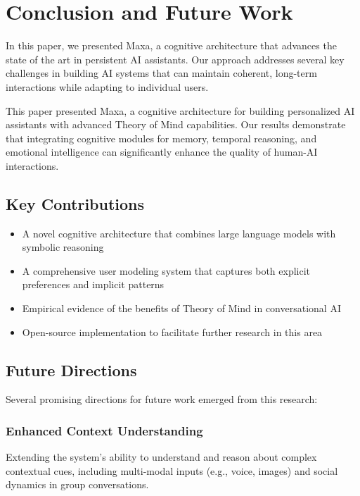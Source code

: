 \section{Conclusion and Future Work}
\label{sec:conclusion}

In this paper, we presented Maxa, a cognitive architecture that advances the state of the art in persistent AI assistants. Our approach addresses several key challenges in building AI systems that can maintain coherent, long-term interactions while adapting to individual users.

This paper presented Maxa, a cognitive architecture for building personalized AI assistants with advanced Theory of Mind capabilities. Our results demonstrate that integrating cognitive modules for memory, temporal reasoning, and emotional intelligence can significantly enhance the quality of human-AI interactions.

\subsection{Key Contributions}

\begin{itemize}
    \item A novel cognitive architecture that combines large language models with symbolic reasoning
    \item A comprehensive user modeling system that captures both explicit preferences and implicit patterns
    \item Empirical evidence of the benefits of Theory of Mind in conversational AI
    \item Open-source implementation to facilitate further research in this area
\end{itemize}

\subsection{Future Directions}

Several promising directions for future work emerged from this research:

\subsubsection{Enhanced Context Understanding}
Extending the system's ability to understand and reason about complex contextual cues, including multi-modal inputs (e.g., voice, images) and social dynamics in group conversations.

